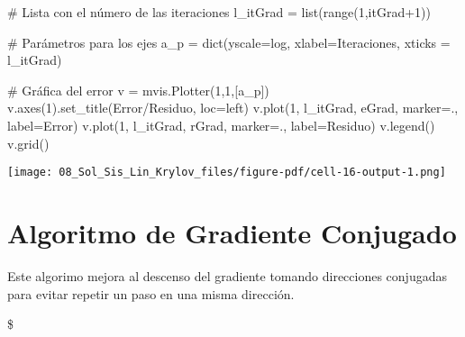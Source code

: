 \documentclass[
  letterpaper,
  DIV=11,
  numbers=noendperiod]{scrreprt}
\newenvironment{Shaded}{\begin{snugshade}}{\end{snugshade}}
\newcommand{\BuiltInTok}[1]{\textcolor[rgb]{0.00,0.23,0.31}{#1}}
\newcommand{\CommentTok}[1]{\textcolor[rgb]{0.37,0.37,0.37}{#1}}
\newcommand{\DecValTok}[1]{\textcolor[rgb]{0.68,0.00,0.00}{#1}}
\newcommand{\NormalTok}[1]{\textcolor[rgb]{0.00,0.23,0.31}{#1}}
\newcommand{\OperatorTok}[1]{\textcolor[rgb]{0.37,0.37,0.37}{#1}}
\newcommand{\StringTok}[1]{\textcolor[rgb]{0.13,0.47,0.30}{#1}}
\begin{document}
\begin{Shaded}
\begin{Highlighting}[]
\CommentTok{\# Lista con el número de las iteraciones}
\NormalTok{l\_itGrad }\OperatorTok{=} \BuiltInTok{list}\NormalTok{(}\BuiltInTok{range}\NormalTok{(}\DecValTok{1}\NormalTok{,itGrad}\OperatorTok{+}\DecValTok{1}\NormalTok{)) }

\CommentTok{\# Parámetros para los ejes}
\NormalTok{a\_p }\OperatorTok{=} \BuiltInTok{dict}\NormalTok{(yscale}\OperatorTok{=}\StringTok{\textquotesingle{}log\textquotesingle{}}\NormalTok{, xlabel}\OperatorTok{=}\StringTok{\textquotesingle{}Iteraciones\textquotesingle{}}\NormalTok{, xticks }\OperatorTok{=}\NormalTok{ l\_itGrad)}

\CommentTok{\# Gráfica del error}
\NormalTok{v }\OperatorTok{=}\NormalTok{ mvis.Plotter(}\DecValTok{1}\NormalTok{,}\DecValTok{1}\NormalTok{,[a\_p]) }
\NormalTok{v.axes(}\DecValTok{1}\NormalTok{).set\_title(}\StringTok{\textquotesingle{}Error/Residuo\textquotesingle{}}\NormalTok{, loc}\OperatorTok{=}\StringTok{\textquotesingle{}left\textquotesingle{}}\NormalTok{)}
\NormalTok{v.plot(}\DecValTok{1}\NormalTok{, l\_itGrad, eGrad, marker}\OperatorTok{=}\StringTok{\textquotesingle{}.\textquotesingle{}}\NormalTok{, label}\OperatorTok{=}\StringTok{\textquotesingle{}Error\textquotesingle{}}\NormalTok{)}
\NormalTok{v.plot(}\DecValTok{1}\NormalTok{, l\_itGrad, rGrad, marker}\OperatorTok{=}\StringTok{\textquotesingle{}.\textquotesingle{}}\NormalTok{, label}\OperatorTok{=}\StringTok{\textquotesingle{}Residuo\textquotesingle{}}\NormalTok{)}
\NormalTok{v.legend()}
\NormalTok{v.grid()}
\end{Highlighting}
\end{Shaded}

\texttt{[image: 08\_Sol\_Sis\_Lin\_Krylov\_files/figure-pdf/cell-16-output-1.png]}

\section{Algoritmo de Gradiente
Conjugado}\label{algoritmo-de-gradiente-conjugado}

Este algorimo mejora al descenso del gradiente tomando direcciones
conjugadas para evitar repetir un paso en una misma dirección.

\$
\end{document}
